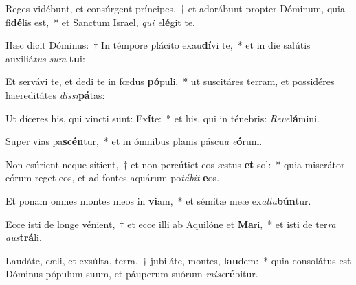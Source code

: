 \item Reges vidébunt, et consúrgent príncipes,~† et adorábunt propter Dóminum, quia fi\textbf{dé}lis est,~* et Sanctum Israel, \textit{qui} \textit{e}\textbf{lé}git te.
\item Hæc dicit Dóminus:~† In témpore plácito exau\textbf{dí}vi te,~* et in die salútis auxiliá\textit{tus} \textit{sum} \textbf{tu}i:
\item Et servávi te, et dedi te in fœdus \textbf{pó}puli,~* ut suscitáres terram, et possidéres haereditátes \textit{dis}\textit{si}\textbf{pá}tas:
\item Ut díceres his, qui vincti sunt: Ex\textbf{í}te:~* et his, qui in ténebris: \textit{Re}\textit{ve}\textbf{lá}mini.
\item Super vias pa\textbf{scén}tur,~* et in ómnibus planis páscu\textit{a} \textit{e}\textbf{ó}rum.
\item Non esúrient neque sítient,~† et non percútiet eos æstus \textbf{et} sol:~* quia miserátor eórum reget eos, et ad fontes aquárum po\textit{tá}\textit{bit} \textbf{e}os.
\item Et ponam omnes montes meos in \textbf{vi}am,~* et sémitæ meæ ex\textit{al}\textit{ta}\textbf{bún}tur.
\item Ecce isti de longe vénient,~† et ecce illi ab Aquilóne et \textbf{Ma}ri,~* et isti de ter\textit{ra} \textit{aus}\textbf{trá}li.
\item Laudáte, cæli, et exsúlta, terra,~† jubiláte, montes, \textbf{lau}dem:~* quia consolátus est Dóminus pópulum suum, et páuperum suórum \textit{mi}\textit{se}\textbf{ré}bitur.
